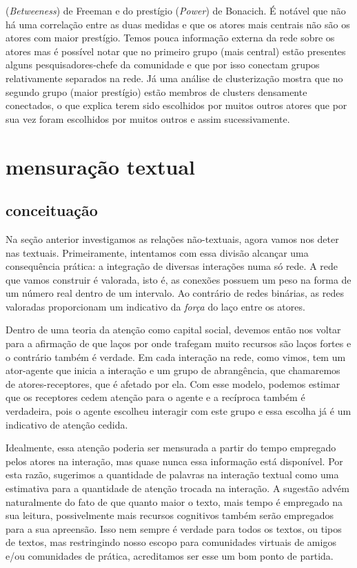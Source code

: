 \documentclass{article}
\begin{document}
\begin{table}[htbp]
\begin{boxedminipage}{\textwidth}
(\textit{Betweeness}) de Freeman e do prestígio (\textit{Power}) de Bonacich.
É notável que não há uma correlação entre as duas medidas e que os atores mais
centrais não são os atores com maior prestígio. Temos pouca informação externa
da rede sobre os atores mas é possível notar que no primeiro grupo (mais
central) estão presentes alguns pesquisadores-chefe da comunidade e que por isso
conectam grupos relativamente separados na rede. Já uma análise de clusterização
mostra que no segundo grupo (maior prestígio) estão membros de clusters
densamente conectados, o que explica terem sido escolhidos por muitos outros
atores que por sua vez foram escolhidos por muitos outros e assim
sucessivamente.

	\end{boxedminipage}
\end{table}
\clearpage

\section{mensuração textual}
\subsection{conceituação}
Na seção anterior investigamos as relações não-textuais, agora vamos nos deter
nas textuais. Primeiramente, intentamos com essa divisão alcançar uma
consequência prática: a integração de diversas interações numa só rede. A rede
que vamos construir é valorada, isto é, as conexões possuem um peso na forma de
um número real dentro de um intervalo. Ao contrário de redes binárias, as redes
valoradas proporcionam um indicativo da \textit{força} do laço entre os atores.

Dentro de uma teoria da atenção como capital social, devemos então nos voltar
para a afirmação de que laços por onde trafegam muito recursos são laços fortes
e o contrário também é verdade. Em cada interação na rede, como vimos, tem um
ator-agente que inicia a interação e um grupo de abrangência, que chamaremos de
atores-receptores, que é afetado por ela. Com esse modelo, podemos estimar que
os receptores cedem atenção para o agente e a recíproca também é verdadeira,
pois o agente escolheu interagir com este grupo e essa escolha já é um
indicativo de atenção cedida.

Idealmente, essa atenção poderia ser mensurada a partir do tempo empregado pelos
atores na interação, mas quase nunca essa informação está disponível. Por esta
razão, sugerimos a quantidade de palavras na interação textual como uma
estimativa para a quantidade de atenção trocada na interação. A sugestão advém
naturalmente do fato de que quanto maior o texto, mais tempo é empregado na sua
leitura, possivelmente mais recursos cognitivos também serão empregados para a
sua apreensão. Isso nem sempre é verdade para todos os textos, ou tipos de
textos, mas restringindo nosso escopo para comunidades virtuais de amigos e/ou
comunidades de prática, acreditamos ser esse um bom ponto de partida.
\end{document}
